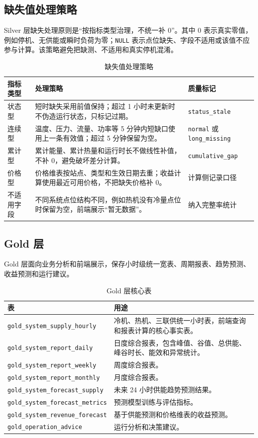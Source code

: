 \documentclass[UTF8,11pt,a4paper]{ctexart}
\newcommand{\code}[1]{\texttt{#1}}
\begin{document}
\subsection{缺失值处理策略}

Silver 层缺失处理原则是“按指标类型治理，不统一补 0”。其中 0 表示真实零值，例如停机、无供能或瞬时负荷为零；\code{NULL} 表示点位缺失、字段不适用或该值不应参与计算。该策略避免把缺测、不适用和真实停机混淆。

\begin{table}[H]
\centering
\small
\begin{tabularx}{\textwidth}{p{2.5cm}Yp{3.5cm}}
\toprule
指标类型 & 处理策略 & 质量标记 \\
\midrule
状态型 & 短时缺失采用前值保持；超过 1 小时未更新时不伪造运行状态，只标记过期。 & \code{status\_stale} \\
连续型 & 温度、压力、流量、功率等 5 分钟内短缺口使用上一条有效值；超过 5 分钟保留为空。 & \code{normal} 或 \code{long\_missing} \\
累计型 & 累计能量、累计热量和运行时长不做线性补值，不补 0，避免破坏差分计算。 & \code{cumulative\_gap} \\
价格型 & 价格维表按站点、类型和生效日期去重；收益计算使用最近可用价格，不把缺失价格补 0。 & 计算侧记录口径 \\
不适用字段 & 不同系统点位结构不同，例如热机没有冷量点位时保留为空，前端展示“暂无数据”。 & 纳入完整率统计 \\
\bottomrule
\end{tabularx}
\caption{缺失值处理策略}
\end{table}

\subsection{Gold 层}

Gold 层面向业务分析和前端展示，保存小时级统一宽表、周期报表、趋势预测、收益预测和运行建议。

\begin{table}[H]
\centering
\small
\begin{tabularx}{\textwidth}{p{4.4cm}Y}
\toprule
表 & 用途 \\
\midrule
\code{gold\_system\_supply\_hourly} & 冷机、热机、三联供统一小时表，前端查询和报表计算的核心事实表。 \\
\code{gold\_system\_report\_daily} & 日度综合报表，包含峰值、谷值、总供能、峰谷时长、能效和异常统计。 \\
\code{gold\_system\_report\_weekly} & 周度综合报表。 \\
\code{gold\_system\_report\_monthly} & 月度综合报表。 \\
\code{gold\_system\_forecast\_supply} & 未来 24 小时供能趋势预测结果。 \\
\code{gold\_system\_forecast\_metrics} & 预测模型训练与评估指标。 \\
\code{gold\_system\_revenue\_forecast} & 基于供能预测和价格维表的收益预测。 \\
\code{gold\_operation\_advice} & 运行分析和决策建议。 \\
\bottomrule
\end{tabularx}
\caption{Gold 层核心表}
\end{table}
\end{document}
